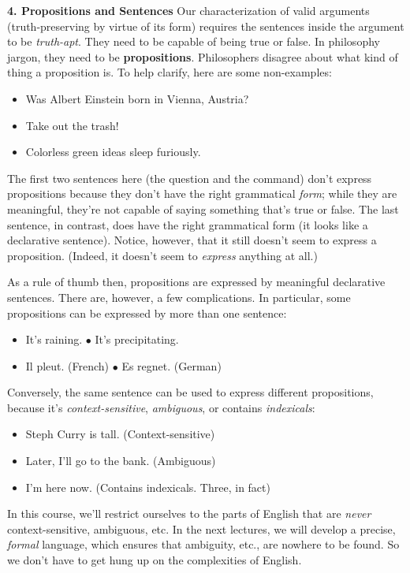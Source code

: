 \documentclass[options]{philosophersimprint}
\theoremstyle{definition}
\begin{document}
\textbf{4. Propositions and Sentences} Our characterization of valid arguments (truth-preserving by virtue of its form) requires the sentences inside the argument to be \textit{truth-apt}. They need to be capable of being true or false. In philosophy jargon, they need to be \textbf{propositions}. Philosophers disagree about what kind of thing a proposition is. To help clarify, here are some non-examples:
\begin{itemize}
    \item Was Albert Einstein born in Vienna, Austria?
    \item Take out the trash!
    \item Colorless green ideas sleep furiously.
\end{itemize}
The first two sentences here (the question and the command) don't express propositions because they don't have the right grammatical \textit{form}; while they are meaningful, they're not capable of saying something that's true or false. The last sentence, in contrast, does have the right grammatical form (it looks like a declarative sentence). Notice, however, that it still doesn't seem to express a proposition. (Indeed, it doesn't seem to \textit{express} anything at all.)

As a rule of thumb then, propositions are expressed by meaningful declarative sentences. There are, however, a few complications. In particular, some propositions can be expressed by more than one sentence:
\begin{itemize}
        \item[$\bullet$] It's raining. \qquad\qquad\qquad $\bullet$ It's precipitating.
        \item[$\bullet$] Il pleut. (French) \qquad\qquad $\bullet$ Es regnet. (German)
\end{itemize}

Conversely, the same sentence can be used to express different propositions, because it's \textit{context-sensitive}, \textit{ambiguous}, or contains \textit{indexicals}:
    \begin{itemize}
        \item Steph Curry is tall. (Context-sensitive)
        \item Later, I'll go to the bank. (Ambiguous)
        \item I'm here now. (Contains indexicals. Three, in fact)
    \end{itemize}

In this course, we'll restrict ourselves to the parts of English that are \textit{never} context-sensitive, ambiguous, etc. In the next lectures, we will develop a precise, \textit{formal} language, which ensures that ambiguity, etc., are nowhere to be found. So we don't have to get hung up on the complexities of English.
\end{document}
